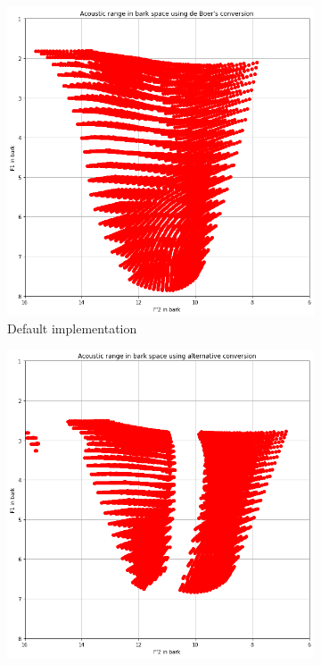 \begin{figure}[ht]
    \centering
    \begin{subfigure}{.45\textwidth}
        \centering
        \includegraphics[width=\textwidth]{images/improving/reachable_acoustic_space-de_boer.png}
        \captionsetup{width=0.9\linewidth}
        \captionsetup{justification=centering}
        \caption{Default implementation}
    \end{subfigure}
    \hspace{0.5cm}
    \begin{subfigure}{.45\textwidth}
        \centering
        \includegraphics[width=\textwidth]{images/improving/reachable_acoustic_space-alternative.png}

\end{subfigure}
\end{figure}
